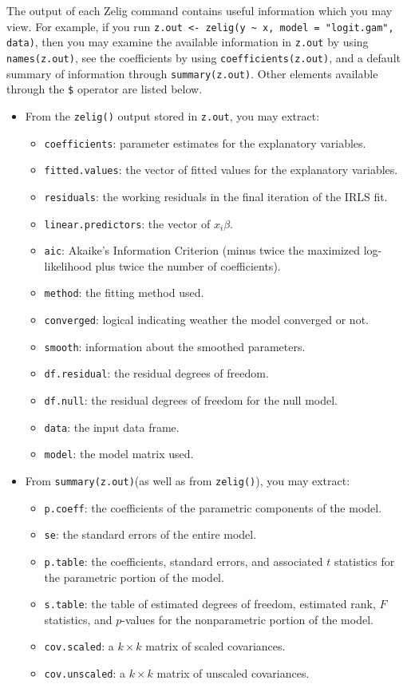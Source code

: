 The output of each Zelig command contains useful information which you may view. For example, if you run {\tt z.out <- zelig(y \~{} x, model = "logit.gam", data)}, then you may examine the available information in {\tt z.out} by using {\tt names(z.out)}, see the coefficients by using {\tt coefficients(z.out)}, and a default summary of information through {\tt summary(z.out)}. Other elements available through the {\tt \$} operator are listed below. 
\begin{itemize}
\item From the {\tt zelig()} output stored in {\tt  z.out}, you may extract:
\begin{itemize}
\item {\tt coefficients}: parameter estimates for the explanatory variables.
\item {\tt fitted.values}: the vector of fitted values for the explanatory variables.
\item {\tt residuals}: the working residuals in the final iteration of the IRLS fit. 
\item {\tt linear.predictors}: the vector of $x_{i}\beta$.
\item {\tt aic}: Akaike's Information Criterion (minus twice the maximized log-likelihood plus twice the number of coefficients).
\item {\tt method}: the fitting method used.
\item {\tt converged}: logical indicating weather the model converged or not.
\item {\tt smooth}: information about the smoothed parameters.
\item {\tt df.residual}: the residual degrees of freedom.
\item {\tt df.null}: the residual degrees of freedom for the null model. 
\item {\tt data}: the input data frame. 
\item {\tt model}: the model matrix used.


\end{itemize}
\item From {\tt summary(z.out)}(as well as from {\tt zelig()}), you may extract:
\begin{itemize}
\item {\tt p.coeff}: the coefficients of the parametric components of the model. 
\item {\tt se}: the standard errors of the entire model. 
\item {\tt p.table}: the coefficients, standard errors, and associated $t$ statistics for the parametric portion of the model. 
\item {\tt s.table}: the table of estimated degrees of freedom, estimated rank, $F$ statistics, and $p$-values for the nonparametric portion of the model. 
\item {\tt cov.scaled}: a $k \times k$ matrix of scaled covariances.
\item {\tt cov.unscaled}: a $k \times k$ matrix of unscaled covariances. 
\end{itemize}



\end{itemize}
